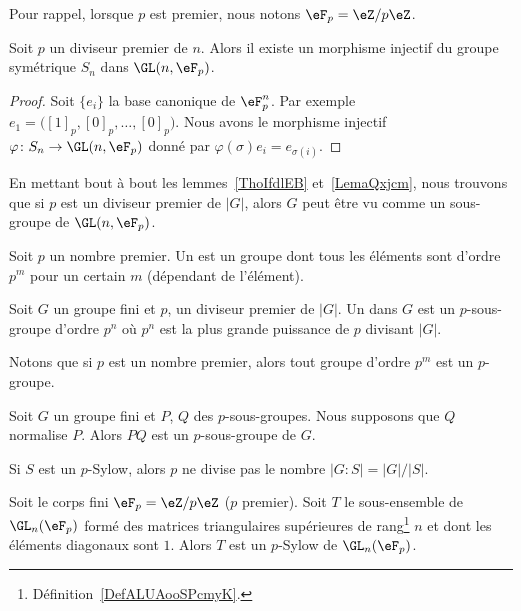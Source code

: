 Pour rappel, lorsque \( p\) est premier, nous notons \( \eF_p=\eZ/p\eZ\).

\begin{lemma}       \label{LemaQxjcm}
	Soit \( p\) un diviseur premier de \( n\). Alors il existe un morphisme injectif du groupe symétrique \( S_n\) dans \( \GL(n,\eF_p)\).
\end{lemma}

\begin{proof}
    Soit \( \{ e_i \}\) la base canonique de \( \eF_p^n\). Par exemple \( e_1=\big( [1]_p,[0]_p,\ldots, [0]_p \big)\). Nous avons le morphisme injectif \( \varphi\colon S_n\to \GL(n,\eF_p)\) donné par \( \varphi(\sigma)e_i=e_{\sigma(i)}\).
\end{proof}

\begin{remark}  \label{RemFzxxst}
	En mettant bout à bout les lemmes~\ref{ThoIfdlEB} et~\ref{LemaQxjcm}, nous trouvons que si \( p\) est un diviseur premier de \( | G |\), alors \( G\) peut être vu comme un sous-groupe de \( \GL(n,\eF_p)\).
\end{remark}

\begin{definition}      \label{DEFooPRCHooVZdwST}
	Soit \( p\) un nombre premier. Un  est un groupe dont tous les éléments sont d'ordre \( p^m\) pour un certain \( m\) (dépendant de l'élément).

	Soit \( G\) un groupe fini et \( p\), un diviseur premier de \( | G |\). Un  dans \( G\) est un \( p\)-sous-groupe d'ordre \( p^n\) où \( p^n\) est la plus grande puissance de \( p\) divisant \( | G |\).
\end{definition}
Notons que si \( p\) est un nombre premier, alors tout groupe d'ordre \( p^m\) est un \( p\)-groupe.

\begin{lemma}
	Soit \( G\) un groupe fini et \( P\), \( Q\) des \( p\)-sous-groupes. Nous supposons que \( Q\) normalise \( P\). Alors \( PQ\) est un \( p\)-sous-groupe de \( G\).
\end{lemma}

Si \( S\) est un \( p\)-Sylow, alors \( p\) ne divise pas le nombre \( | G:S |=| G |/| S |\).

\begin{proposition}     \label{Propvocmon}
	Soit le corps fini \( \eF_p=\eZ/p\eZ\) (\( p\) premier). Soit \( T\) le sous-ensemble de \( \GL_n(\eF_p)\) formé des matrices triangulaires supérieures de rang\footnote{Définition~\ref{DefALUAooSPcmyK}.} \( n\) et dont les éléments diagonaux sont \( 1\). Alors \( T\) est un \( p\)-Sylow de \( \GL_n(\eF_p)\).
\end{proposition}

